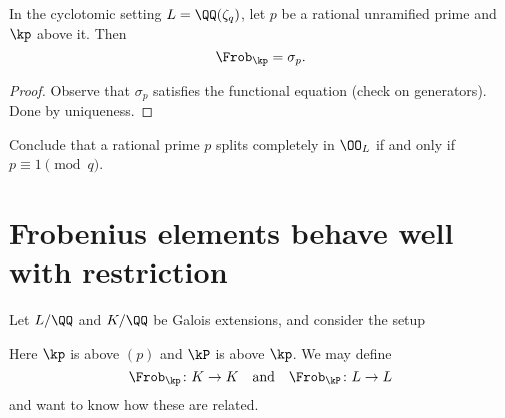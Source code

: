 \begin{lemma}
	\label{lem:cyclo_frob}
	In the cyclotomic setting $L = \QQ(\zeta_q)$,
	let $p$ be a rational unramified prime
	and $\kp$ above it. Then \[ \Frob_\kp = \sigma_p. \]
\end{lemma}
\begin{proof}
	Observe that $\sigma_p$ satisfies the functional equation
	(check on generators).
	Done by uniqueness.
%
\end{proof}

\begin{ques}
	Conclude that a rational prime $p$
	splits completely in $\OO_L$ if and only if $p \equiv 1 \pmod q$.
\end{ques}

\section{Frobenius elements behave well with restriction}
Let $L/\QQ$ and $K/\QQ$ be Galois extensions, and consider the setup
\begin{center}
\end{center}
Here $\kp$ is above $(p)$ and $\kP$ is above $\kp$.
We may define
\[ \Frob_\kp \colon K \to K
	\quad\text{and}\quad
	\Frob_{\kP} \colon L \to L \]
and want to know how these are related.


